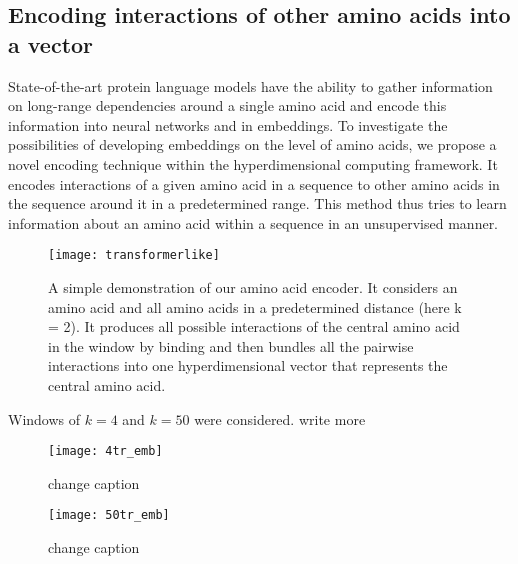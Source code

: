 \subsection*{Encoding interactions of other amino acids into a vector}
State-of-the-art protein language models have the ability to gather information on long-range dependencies around a single amino acid and encode this information into neural networks and in embeddings. To investigate the possibilities of developing embeddings on the level of amino acids, we propose a novel encoding technique within the hyperdimensional computing framework. It encodes interactions of a given amino acid in a sequence to other amino acids in the sequence around it in a predetermined range. This method thus tries to learn information about an amino acid within a sequence in an unsupervised manner.
\begin{figure}[H]
    \centering
    \texttt{[image: transformerlike]}
    \caption{A simple demonstration of our amino acid encoder. It considers an amino acid and all amino acids in a predetermined distance (here k = 2). It produces all possible interactions of the central amino acid in the window by binding and then bundles all the pairwise interactions into one hyperdimensional vector that represents the central amino acid.}
    \label{fig:AAtr}
\end{figure}

Windows of $k = 4$ and $k = 50$ were considered. write more

\begin{figure}[H]
    \centering
    \texttt{[image: 4tr\_emb]}
    \caption{change caption}
    \label{fig:AAtr4}
\end{figure}

\begin{figure}[H]
    \centering
    \texttt{[image: 50tr\_emb]}
    \caption{change caption}
    \label{fig:AAtr50}
\end{figure}
